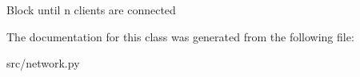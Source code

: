 \begin{DoxyVerb}Block until n clients are connected \end{DoxyVerb}
 

\-The documentation for this class was generated from the following file\-:\begin{DoxyCompactItemize}
\item 
src/network.\-py\end{DoxyCompactItemize}
